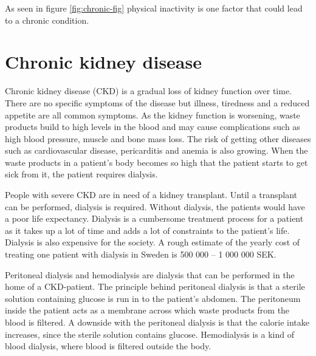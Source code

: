 \documentclass{cslthse-msc}
\begin{document}
As seen in figure \ref{fig:chronic-fig} physical inactivity is one factor that could lead to a chronic condition. 



\section{Chronic kidney disease}
\label{sec:kiney}

Chronic kidney disease (CKD) is a gradual loss of kidney function over time\cite{KIDNEYFOUNDATION}. There are no specific symptoms of the disease but illness, tiredness and a reduced appetite are all common symptoms. As the kidney function is worsening, waste products build to high levels in the blood and may cause complications such as high blood pressure,  muscle and bone mass loss. The risk of getting other diseases such as cardiovascular disease, pericarditis and anemia is also growing.  When the waste products in a patient’s body becomes so high that the patient starts to get sick from it, the patient requires dialysis\cite{KIDNEYFOUNDATION}.%

People with severe CKD are in need of a kidney transplant. Until a transplant can be performed, dialysis is required. Without dialysis, the patients would have a poor life expectancy\cite{KIDNEYFOUNDATION}. Dialysis is a cumbersome treatment process for a patient as it takes up a lot of time and adds a lot of constraints to the patient’s life. Dialysis is also expensive for the society. A rough estimate of the yearly cost of treating one patient with dialysis in Sweden is 500 000 – 1 000 000 SEK. 

Peritoneal dialysis and hemodialysis are dialysis that can be performed in the home of a CKD-patient. The principle behind peritoneal dialysis is that a sterile solution containing glucose is run in to the patient’s abdomen\cite{DIALYSIS}. The peritoneum inside the patient acts as a membrane across which waste products from the blood is filtered. A downside with the peritoneal dialysis is that the calorie intake increases, since the sterile solution contains glucose. Hemodialysis is a kind of blood dialysis, where blood is filtered outside the body.
\end{document}
